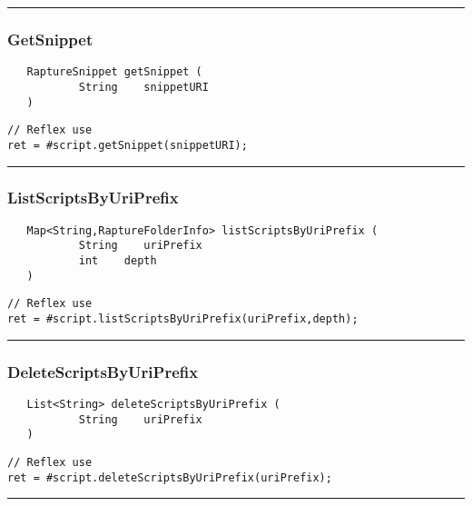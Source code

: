 \rule{15cm}{2pt}
\subsubsection{GetSnippet}
\label{Api:GetSnippet}
\begin{verbatim}
   RaptureSnippet getSnippet (
           String    snippetURI
   )
\end{verbatim}
\begin{lstlisting}[language=reflex]
// Reflex use
ret = #script.getSnippet(snippetURI);
\end{lstlisting}



\rule{15cm}{2pt}
\subsubsection{ListScriptsByUriPrefix}
\label{Api:ListScriptsByUriPrefix}
\begin{verbatim}
   Map<String,RaptureFolderInfo> listScriptsByUriPrefix (
           String    uriPrefix
           int    depth
   )
\end{verbatim}
\begin{lstlisting}[language=reflex]
// Reflex use
ret = #script.listScriptsByUriPrefix(uriPrefix,depth);
\end{lstlisting}



\rule{15cm}{2pt}
\subsubsection{DeleteScriptsByUriPrefix}
\label{Api:DeleteScriptsByUriPrefix}
\begin{verbatim}
   List<String> deleteScriptsByUriPrefix (
           String    uriPrefix
   )
\end{verbatim}
\begin{lstlisting}[language=reflex]
// Reflex use
ret = #script.deleteScriptsByUriPrefix(uriPrefix);
\end{lstlisting}



\rule{15cm}{2pt}

